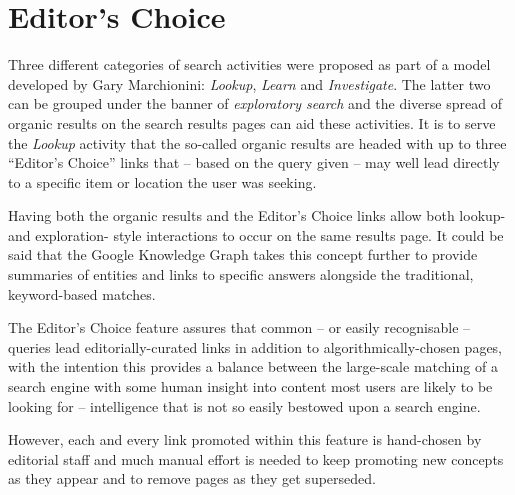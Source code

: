 \section{Editor's Choice}

Three different categories of search activities were proposed
as part of a model developed by
Gary Marchionini\cite{marchionini2006exploratory}:
\emph{Lookup}, \emph{Learn} and \emph{Investigate}. The
latter two can be grouped under the banner of \emph{exploratory search}
and the diverse spread of organic results on the search results pages
can aid these activities. It is to serve the \emph{Lookup} activity
that the so-called organic results are headed with up to three
``Editor's Choice'' links that -- based on the query given -- may
well lead directly to a specific item or location the user was seeking.

Having both the organic results and the Editor's Choice links
allow both lookup- and exploration-
style interactions to occur on the same results page. It could be said
that the Google Knowledge Graph\cite{singhal2012introducing} takes
this concept further to provide summaries of entities and links to
specific answers alongside the traditional, keyword-based matches.

The Editor's Choice feature assures that common -- or easily recognisable -- queries
lead editorially-curated links in addition to algorithmically-chosen pages,
with the intention this provides a balance between the large-scale
matching of a search engine with some human insight into content
most users are likely to be looking for -- intelligence that is not
so easily bestowed upon a search engine.

However, each and every link promoted within this feature is hand-chosen by editorial
staff and much manual effort is needed to keep promoting new concepts
as they appear and to remove pages as they get superseded.

